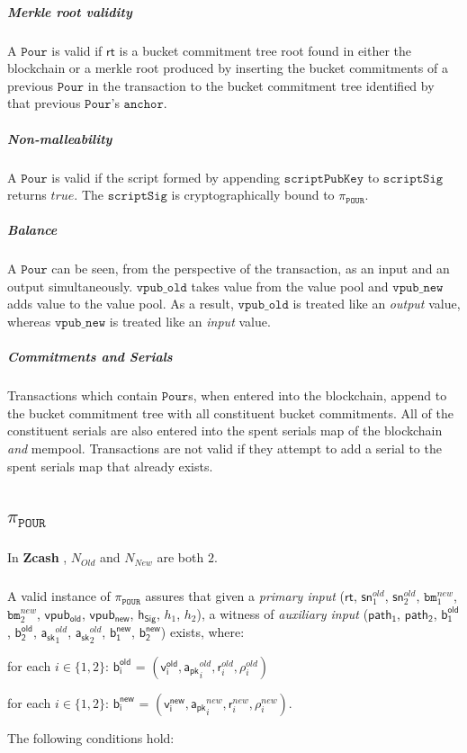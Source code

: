 \documentclass[8pt]{article}
\newcommand{\Zcash}{\textbf{Zcash} }
\newcommand{\SpendAuthorityPublic}{\mathsf{a_{pk}}}
\newcommand{\SpendAuthorityPrivate}{\mathsf{a_{sk}}}
\newcommand{\BucketRand}{\mathsf{r}}
\newcommand{\BucketAddressRand}{\mathsf{\rho}}
\newcommand{\bm}{\mathbf{\mathtt{bm}}}
\newcommand{\Pour}{\mathtt{Pour}}
\newcommand{\sn}{\mathsf{sn}}
\newcommand{\vpubOld}{\mathtt{vpub\_old}}
\newcommand{\vpubNew}{\mathtt{vpub\_new}}
\newcommand{\anchor}{\mathtt{anchor}}
\newcommand{\scriptSig}{\mathtt{scriptSig}}
\newcommand{\scriptPubKey}{\mathtt{scriptPubKey}}
\newcommand{\rt}{\mathsf{rt}}
\newcommand{\hSig}{\mathsf{h_{Sig}}}
\newcommand{\Nold}{N_{Old}}
\newcommand{\Nnew}{N_{New}}
\newcommand{\PourStatement}{\texttt{POUR}}
\newcommand{\PourProof}{\pi_{\PourStatement}}
\newcommand{\vpubold}{\mathsf{vpub_{old}}}
\newcommand{\vpubnew}{\mathsf{vpub_{new}}}
\newcommand{\bOld}[1]{\mathsf{b_{#1}^{old}}}
\newcommand{\bNew}[1]{\mathsf{b_{#1}^{new}}}
\newcommand{\vOld}[1]{\mathsf{v_{#1}^{old}}}
\newcommand{\vNew}[1]{\mathsf{v_{#1}^{new}}}
\newcommand{\path}[1]{\mathsf{path_{#1}}}
\begin{document}
\subparagraph{Merkle root validity}

A $\Pour$ is valid if $\rt$ is a bucket commitment tree root found in either the blockchain or a merkle root produced by inserting the bucket commitments of a previous $\Pour$ in the transaction to the bucket commitment tree identified by that previous $\Pour$'s $\anchor$.

\subparagraph{Non-malleability}

A $\Pour$ is valid if the script formed by appending $\scriptPubKey$ to $\scriptSig$ returns $true$. The $\scriptSig$ is cryptographically bound to $\PourProof$.

\subparagraph{Balance}

A $\Pour$ can be seen, from the perspective of the transaction, as an input and an output simultaneously. $\vpubOld$ takes value from the value pool and $\vpubNew$ adds value to the value pool. As a result, $\vpubOld$ is treated like an \textit{output} value, whereas $\vpubNew$ is treated like an \textit{input} value.

\subparagraph{Commitments and Serials}

Transactions which contain $\Pour$s, when entered into the blockchain, append to the bucket commitment tree with all constituent bucket commitments. All of the constituent serials are also entered into the spent serials map of the blockchain \textit{and} mempool. Transactions are not valid if they attempt to add a serial to the spent serials map that already exists.

\subsection{$\PourProof$}

\subparagraph{}

In \Zcash, $\Nold$ and $\Nnew$ are both $2$.

\subparagraph{}

A valid instance of $\PourProof$ assures that given a \textit{primary input} ($\rt$, $\sn^{old}_{1}$, $\sn^{old}_{2}$, $\bm^{new}_{1}$, $\bm^{new}_{2}$, $\vpubold$, $\vpubnew$, $\hSig$, $h_1$, $h_2$), a witness of \textit{auxiliary input} ($\path{1}$, $\path{2}$, $\bOld{1}$, $\bOld{2}$, $\SpendAuthorityPrivate^{old}_1$, $\SpendAuthorityPrivate^{old}_2$, $\bNew{1}$, $\bNew{2}$) exists, where:

\begin{list}{}{}

\item for each $i \in \{1, 2\}$: $\bOld{i}$ = $(\vOld{i}, \SpendAuthorityPublic^{old}_i, \BucketRand^{old}_i, \BucketAddressRand^{old}_i)$

\item for each $i \in \{1, 2\}$: $\bNew{i}$ = $(\vNew{i}, \SpendAuthorityPublic^{new}_i, \BucketRand^{new}_i, \BucketAddressRand^{new}_i)$.

\item The following conditions hold:

\end{list}
\end{document}
